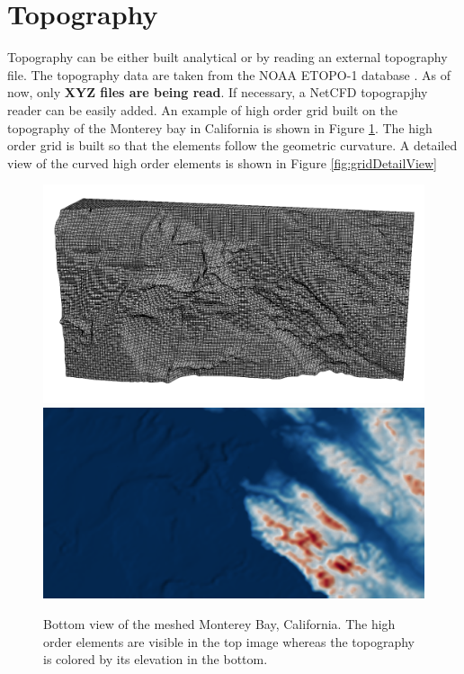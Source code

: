 \documentclass{report}
\begin{document}
{\section{Topography}
Topography can be either built analytical or by reading an external topography file. The topography data are taken from the NOAA ETOPO-1 database \cite{etopo1}. As of now, only {\bf XYZ files are being read}. If necessary, a NetCFD topograpjhy reader can be easily added.
An example of high order grid built on the topography of the Monterey bay in California is shown in Figure \ref{fig:montereySurfaceGrid}. The high order grid is built so that the elements follow the geometric curvature. A detailed view of the curved high order elements is shown in Figure \ref{fig:gridDetailView}

\begin{figure}[htbp]
\centering
\includegraphics[width=\textwidth]{figures/monterey_with_grid.png}
\includegraphics[width=\textwidth]{figures/monterey_colorscale.png}
\caption{Bottom view of the meshed Monterey Bay, California. The high order elements are visible in the top image whereas the topography is colored by its elevation in the bottom.}
\label{fig:montereySurfaceGrid}
\end{figure}

}
\end{document}
